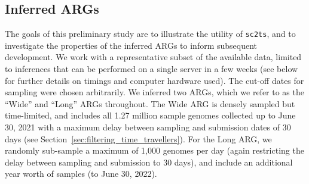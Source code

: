 \documentclass{article}
\begin{document}
\subsection{Inferred ARGs}
The goals of this preliminary study are to illustrate the utility of
\texttt{sc2ts}, and to investigate the properties of the
inferred ARGs to inform subsequent development.
We work with a
representative subset of the available data, limited to
inferences that can be performed on a single server in
a few weeks (see below for further details on timings and
computer hardware used). The cut-off dates for sampling were chosen
arbitrarily.
We inferred two ARGs, which we refer to as the
``Wide'' and ``Long'' ARGs throughout.
The Wide ARG is densely sampled but time-limited, and
includes all 1.27 million sample genomes collected up to June 30, 2021
with a maximum delay between sampling and submission dates of 30 days
(see Section~\ref{sec:filtering_time_travellers}).
For the Long ARG, we randomly sub-sample a maximum of 1,000 genomes per
day (again restricting the delay between sampling and submission to 30 days),
and include an additional year worth of samples (to June 30, 2022).
\end{document}
